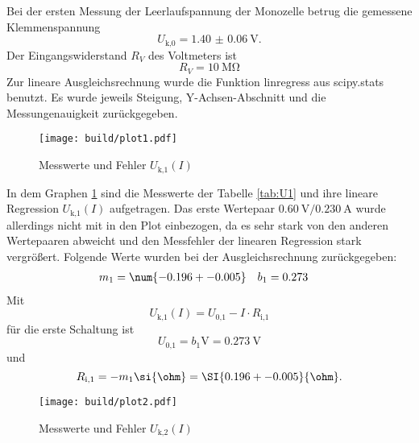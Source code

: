   Bei der ersten Messung der Leerlaufspannung der Monozelle betrug die
  gemessene Klemmenspannung
  \begin{equation}
    U_\text{k,0} = \SI{1.40(6)}{\V}.
  \end{equation}
  Der Eingangswiderstand $R_V$ des Voltmeters ist
  \begin{equation}
    R_V = \SI{10}{\mega\ohm}
  \end{equation}
  Zur lineare Ausgleichsrechnung wurde die Funktion linregress aus scipy.stats
  \cite{scipy}
  benutzt. Es wurde jeweils Steigung, Y-Achsen-Abschnitt und die
  Messungenauigkeit zurückgegeben.

  \newpage

  \begin{figure}[h]
    \texttt{[image: build/plot1.pdf]}
    \caption{Messwerte und Fehler $U_\text{k,1}(I)$}
    \label{fig:U1}
  \end{figure}

  In dem Graphen \ref{fig:U1} sind die Messwerte der Tabelle
  \ref{tab:U1} und ihre lineare Regression
  $U_\text{k,1}(I)$ aufgetragen.
  Das erste Wertepaar $\SI{0.60}{\V}/ \SI{0.230}{\A}$
  wurde allerdings nicht mit in den Plot einbezogen,
  da es sehr stark von den anderen Wertepaaren abweicht und
  den Messfehler der linearen Regression stark vergrößert.
  Folgende Werte wurden bei der Ausgleichsrechnung zurückgegeben:
  \begin{align}
    m_1 & = \num{-0.196 +- 0.005} & b_1 & = 0.273
  \end{align}
  Mit
  \begin{equation}
    U_\text{k,1}(I) = U_\text{0,1} - I \cdot R_\text{i,1}
  \end{equation}
  für die erste Schaltung ist
  \begin{equation}
    U_\text{0,1} = b_1 \si{\V} = \SI{0.273}{\V}
  \end{equation}
  und
  \begin{equation}
    R_\text{i,1} = -m_1 \si{\ohm} = \SI{0.196 +- 0.005}{\ohm}.
  \end{equation}

  \newpage

  \begin{figure}[h]
    \texttt{[image: build/plot2.pdf]}
    \caption{Messwerte und Fehler $U_\text{k,2}(I)$}
    \label{fig:U2}
  \end{figure}

